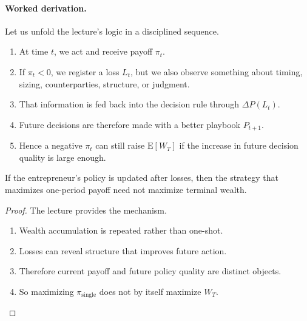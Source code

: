 \paragraph{Worked derivation.} Let us unfold the lecture's logic in a disciplined sequence.
\begin{enumerate}
\item At time \(t\), we act and receive payoff \(\pi_t\).
\item If \(\pi_t<0\), we register a loss \(L_t\), but we also observe something about timing, sizing, counterparties, structure, or judgment.
\item That information is fed back into the decision rule through \(\Delta P(L_t)\).
\item Future decisions are therefore made with a better playbook \(P_{t+1}\).
\item Hence a negative \(\pi_t\) can still raise \(\mathrm{E}[W_T]\) if the increase in future decision quality is large enough.
\end{enumerate}

\begin{proposition}
If the entrepreneur's policy is updated after losses, then the strategy that maximizes one-period payoff need not maximize terminal wealth.
\end{proposition}

\begin{proof}
The lecture provides the mechanism.
\begin{enumerate}
\item Wealth accumulation is repeated rather than one-shot.
\item Losses can reveal structure that improves future action.
\item Therefore current payoff and future policy quality are distinct objects.
\item So maximizing \(\pi_{\mathrm{single}}\) does not by itself maximize \(W_T\).
\end{enumerate}
\end{proof}

\begin{figure}
\centering
{}
\end{figure}

